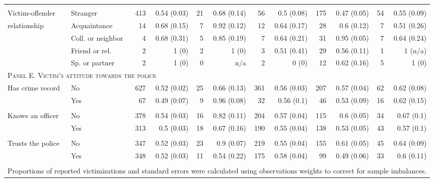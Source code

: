 \begin{tabular}{p{1.3in}p{1.1in}rrrrrrrrrr}
	\vspace{1pt}\\
	
	Victim-offender  & Stranger & 413 & 0.54 (0.03) & 21 & 0.68 (0.14) & 56 & 0.5 (0.08) & 175 & 0.47 (0.05) & 54 & 0.55 (0.09) \\ 
		relationship & Acquaintance & 14 & 0.68 (0.15) & 7 & 0.92 (0.12) & 12 & 0.64 (0.17) & 28 & 0.6 (0.12) & 7 & 0.51 (0.26) \\ 
	& Coll. or neighbor & 4 & 0.68 (0.31) & 5 & 0.85 (0.19) & 7 & 0.64 (0.21) & 31 & 0.95 (0.05) & 7 & 0.64 (0.24) \\ 
		& Friend or rel. & 2 & 1 (0) & 2 & 1 (0) & 3 & 0.51 (0.41) & 29 & 0.56 (0.11) & 1 & 1 (n/a) \\ 
	& Sp. or partner & 2 & 1 (0) & 0 & n/a & 2 & 0 (0) & 12 & 0.62 (0.16) & 5 & 1 (0) \\ 


	
	\midrule
	\multicolumn{12}{l}{\textsc{Panel E. Victim's attitude towards the police}} \\
	Has crime record & No & 627 & 0.52 (0.02) & 25 & 0.66 (0.13) & 361 & 0.56 (0.03) & 207 & 0.57 (0.04) & 62 & 0.62 (0.08) \\ 
	& Yes & 67 & 0.49 (0.07) & 9 & 0.96 (0.08) & 32 & 0.56 (0.1) & 46 & 0.53 (0.09) & 16 & 0.62 (0.15) \\ 
			\vspace{1pt}\\
	Knows an officer & No & 378 & 0.54 (0.03) & 16 & 0.82 (0.11) & 204 & 0.57 (0.04) & 115 & 0.6 (0.05) & 34 & 0.67 (0.1) \\ 
	& Yes & 313 & 0.5 (0.03) & 18 & 0.67 (0.16) & 190 & 0.55 (0.04) & 138 & 0.53 (0.05) & 43 & 0.57 (0.1) \\ 
					\vspace{1pt}\\
	Trusts the police & No & 347 & 0.52 (0.03) & 23 & 0.9 (0.07) & 219 & 0.55 (0.04) & 155 & 0.61 (0.05) & 45 & 0.64 (0.09) \\ 
	& Yes & 348 & 0.52 (0.03) & 11 & 0.54 (0.22) & 175 & 0.58 (0.04) & 99 & 0.49 (0.06) & 33 & 0.6 (0.11) \\ 

	
	\bottomrule
\vspace{1pt}\\
\multicolumn{12}{l}{\small Proportions of reported victimizations and standard errors were calculated using observations weights to correct for sample imbalances.}
\end{tabular}


